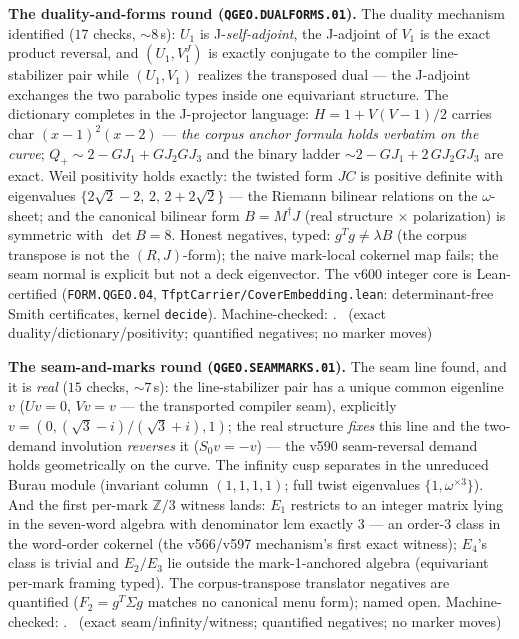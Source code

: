 \par\smallskip\noindent\textbf{The duality-and-forms round
(\texttt{QGEO.DUALFORMS.01}).}
The duality mechanism identified ($17$ checks, ${\sim}8$\,s): $U_1$
is J-\emph{self-adjoint}, the J-adjoint of $V_1$ is the exact product
reversal, and $(U_1,V_1^J)$ is exactly conjugate to the compiler
line-stabilizer pair while $(U_1,V_1)$ realizes the transposed dual
--- the J-adjoint exchanges the two parabolic types inside one
equivariant structure.  The dictionary completes in the J-projector
language: $H=1+V(V-1)/2$ carries char $(x-1)^2(x-2)$ --- \emph{the
corpus anchor formula holds verbatim on the curve}; $Q_+\sim
2-GJ_1+GJ_2GJ_3$ and the binary ladder $\sim 2-GJ_1+2\,GJ_2GJ_3$ are
exact.  Weil positivity holds exactly: the twisted form $JC$ is
positive definite with eigenvalues $\{2\sqrt2-2,\,2,\,2+2\sqrt2\}$
--- the Riemann bilinear relations on the $\omega$-sheet; and the
canonical bilinear form $B=M^\dagger J$ (real structure $\times$
polarization) is symmetric with $\det B=8$.  Honest negatives, typed:
$g^Tg\ne\lambda B$ (the corpus transpose is not the $(R,J)$-form);
the naive mark-local cokernel map fails; the seam normal is explicit
but not a deck eigenvector.  The v600 integer core is Lean-certified
(\texttt{FORM.QGEO.04}, \texttt{TfptCarrier/CoverEmbedding.lean}:
determinant-free Smith certificates, kernel \texttt{decide}).
Machine-checked: .
\mE\ (exact duality/dictionary/positivity; quantified negatives; no
marker moves)
\par\smallskip

\par\smallskip\noindent\textbf{The seam-and-marks round
(\texttt{QGEO.SEAMMARKS.01}).}
The seam line found, and it is \emph{real} ($15$ checks, ${\sim}7$\,s):
the line-stabilizer pair has a unique common eigenline $v$ ($Uv=0$,
$Vv=v$ --- the transported compiler seam), explicitly
$v=(0,(\sqrt3-i)/(\sqrt3+i),1)$; the real structure \emph{fixes} this
line and the two-demand involution \emph{reverses} it ($S_0v=-v$) ---
the v590 seam-reversal demand holds geometrically on the curve.  The
infinity cusp separates in the unreduced Burau module (invariant
column $(1,1,1,1)$; full twist eigenvalues $\{1,\omega^{\times3}\}$).
And the first per-mark $\mathbb{Z}/3$ witness lands: $E_1$ restricts
to an integer matrix lying in the seven-word algebra with
denominator lcm exactly $3$ --- an order-$3$ class in the word-order
cokernel (the v566/v597 mechanism's first exact witness); $E_4$'s
class is trivial and $E_2/E_3$ lie outside the mark-1-anchored
algebra (equivariant per-mark framing typed).  The corpus-transpose
translator negatives are quantified ($F_2=g^T\Sigma g$ matches no
canonical menu form); named open.
Machine-checked: .
\mE\ (exact seam/infinity/witness; quantified negatives; no marker
moves)
\par\smallskip


